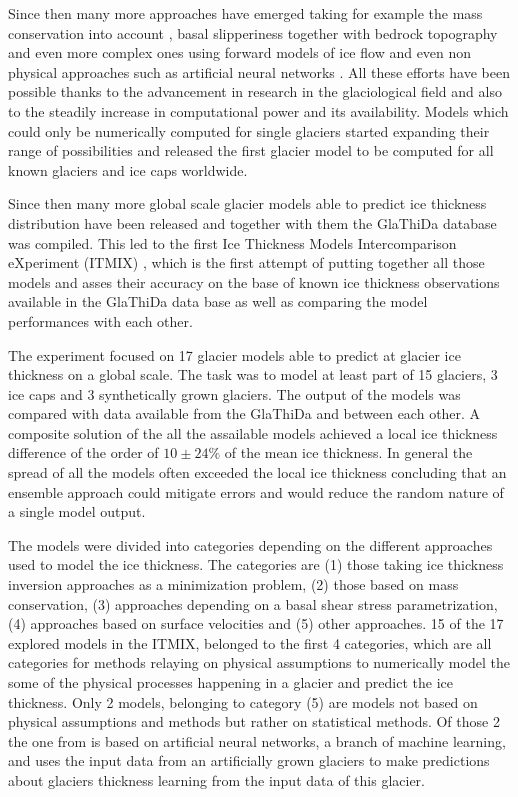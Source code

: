 Since then many more approaches have emerged taking for example the mass conservation into account \cite{rasmussen_1988}, basal slipperiness together with bedrock topography \cite{Gudmundsson2001} and even more complex ones using forward models of ice flow \cite{vanPelt2013} and even non physical approaches such as artificial neural networks \cite{Clarke2009}. All these efforts have been possible thanks to the advancement in research in the glaciological field and also to the steadily increase in computational power and its availability. Models which could only be numerically computed for single glaciers started expanding their range of possibilities and \citet{Huss2012} released the first glacier model to be computed for all known glaciers and ice caps worldwide.

Since then many more global scale glacier models able to predict ice thickness distribution have been released and together with them the GlaThiDa database was compiled. This led to the first Ice Thickness Models Intercomparison eXperiment (ITMIX) \cite{Farinotti2017}, which is the first attempt of putting together all those models and asses their accuracy on the base of known ice thickness observations available in the GlaThiDa data base as well as comparing the model performances with each other. 

The experiment focused on 17 glacier models able to predict at glacier ice thickness on a global scale. The task was to model at least part of 15 glaciers, 3 ice caps and 3 synthetically grown glaciers. The output of the models was compared with data available from the GlaThiDa and between each other. A composite solution of the all the assailable models achieved a local ice thickness difference of the order of $10 \pm 24\%$ of the mean ice thickness. In general the spread of all the  models often exceeded the local ice thickness concluding that an ensemble approach could mitigate errors and would reduce the random nature of a single model output.

The models were divided into categories depending on the different approaches used to model the ice thickness. The categories are (1) those taking ice thickness inversion approaches as a minimization problem, (2) those based on mass conservation,  (3) approaches depending on a basal shear stress parametrization, (4) approaches based on surface velocities and (5) other approaches. 15 of the 17 explored models in the ITMIX, belonged to the first 4 categories, which are all categories for methods relaying on physical assumptions to numerically model the some of the physical processes happening in a glacier and predict the ice thickness. Only 2 models, belonging to category (5) are models not based on physical assumptions and methods but rather on statistical methods. Of those 2 the one from \citet{Clarke2009} is based on artificial neural networks, a branch of machine learning, and uses the input data from an artificially grown glaciers to make predictions about glaciers thickness learning from the input data of this glacier.


